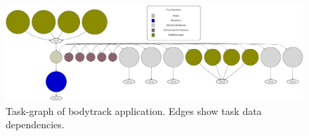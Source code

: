 \begin{figure}[t!]%
	\center
	\includegraphics[width=\columnwidth]{task_benchmarks/figures/bodytrack_taskgraph}%
	\caption{Task-graph of bodytrack application.  Edges show task data dependencies.}
	\label{fig:bodytrack_tg}%
	\vspace{.5cm}
\end{figure}



